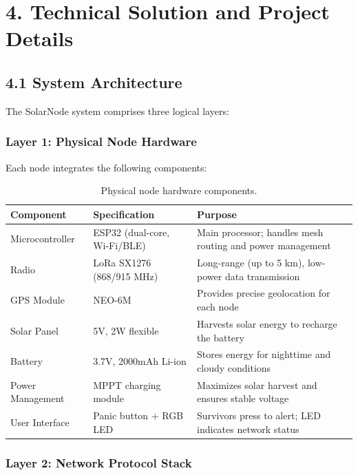 \documentclass[12pt,a4paper]{article}
\begin{document}
\section*{4. Technical Solution and Project Details}

\subsection*{4.1 System Architecture}

The SolarNode system comprises three logical layers:

\subsubsection*{Layer 1: Physical Node Hardware}

Each node integrates the following components:

\begin{table}[H]
\centering
\begin{tabular}{@{}l l p{6cm}@{}}
\toprule
\textbf{Component} & \textbf{Specification} & \textbf{Purpose} \\
\midrule
Microcontroller & ESP32 (dual-core, Wi-Fi/BLE) & Main processor; handles mesh routing and power management \\
Radio & LoRa SX1276 (868/915 MHz) & Long-range (up to 5 km), low-power data transmission \\
GPS Module & NEO-6M & Provides precise geolocation for each node \\
Solar Panel & 5V, 2W flexible & Harvests solar energy to recharge the battery \\
Battery & 3.7V, 2000mAh Li-ion & Stores energy for nighttime and cloudy conditions \\
Power Management & MPPT charging module & Maximizes solar harvest and ensures stable voltage \\
User Interface & Panic button + RGB LED & Survivors press to alert; LED indicates network status \\
\bottomrule
\end{tabular}
\caption{Physical node hardware components.}
\label{tab:hardware}
\end{table}

\subsubsection*{Layer 2: Network Protocol Stack}
\end{document}

